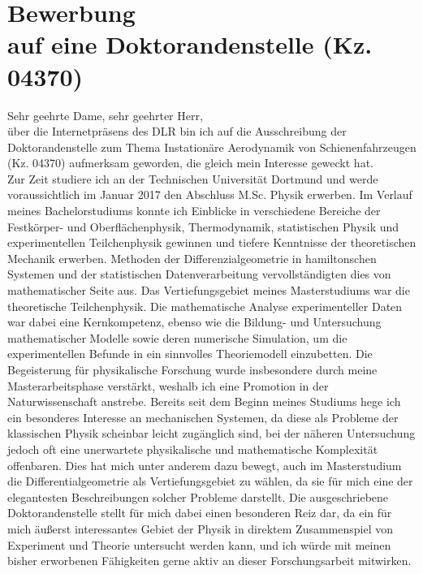 \documentclass[12pt]{scrartcl}
\begin{document}
\pagestyle{empty}

\section*{Bewerbung \\
auf eine Doktorandenstelle 
(Kz. 04370)}

\vspace{0.4in}

Sehr geehrte Dame, sehr geehrter Herr,
\\

über die Internetpräsens des DLR bin ich auf die Ausschreibung der 
Doktorandenstelle zum Thema {\glqq Instationäre Aerodynamik von 
Schienenfahrzeugen\grqq} (Kz. 04370) aufmerksam geworden, die gleich mein 
Interesse geweckt hat.
\\

Zur Zeit studiere ich an der Technischen Universität Dortmund und werde 
voraussichtlich im Januar 2017 den Abschluss M.Sc. Physik erwerben. Im 
Verlauf meines Bachelorstudiums konnte ich Einblicke in verschiedene Bereiche 
der Festkörper- und Oberflächenphysik, Thermodynamik, statistischen Physik und 
experimentellen Teilchenphysik gewinnen und tiefere Kenntnisse der 
theoretischen Mechanik erwerben. Methoden der Differenzialgeometrie in 
hamiltonschen Systemen und der statistischen Datenverarbeitung 
vervollständigten dies von mathematischer Seite aus. Das Vertiefungsgebiet 
meines Masterstudiums war die theoretische Teilchenphysik. Die mathematische 
Analyse experimenteller Daten war dabei eine Kernkompetenz, ebenso wie die 
Bildung- und Untersuchung mathematischer Modelle sowie deren numerische 
Simulation, um die experimentellen 
Befunde in ein sinnvolles Theoriemodell einzubetten.
Die Begeisterung für physikalische Forschung wurde insbesondere durch meine 
Masterarbeitsphase verstärkt, weshalb ich eine Promotion in der 
Naturwissenschaft anstrebe. 
Bereits seit dem Beginn meines Studiums hege ich ein besonderes Interesse an 
mechanischen Systemen, da diese als Probleme der klassischen Physik scheinbar 
leicht zugänglich sind, bei der näheren Untersuchung jedoch oft eine 
unerwartete physikalische und mathematische Komplexität offenbaren. Dies hat 
mich unter anderem dazu bewegt, auch im Masterstudium die 
Differentialgeometrie als Vertiefungsgebiet zu wählen, da sie für mich eine der 
elegantesten Beschreibungen solcher Probleme darstellt. 
Die ausgeschriebene Doktorandenstelle stellt für mich dabei einen besonderen 
Reiz dar, da ein für mich äußerst interessantes Gebiet der Physik in direktem  
Zusammenspiel von Experiment und Theorie untersucht werden kann, und ich würde 
mit meinen bisher erworbenen Fähigkeiten gerne aktiv an dieser Forschungsarbeit 
mitwirken.
\\
\end{document}
